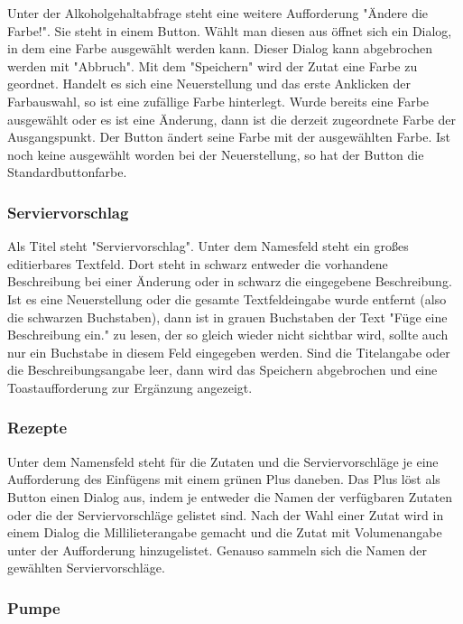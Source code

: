 Unter der Alkoholgehaltabfrage steht eine weitere Aufforderung "Ändere die Farbe!". Sie steht in einem Button. Wählt man diesen aus öffnet sich ein Dialog, in dem eine Farbe ausgewählt werden kann. Dieser Dialog kann abgebrochen werden mit "Abbruch". Mit dem "Speichern" wird der Zutat eine Farbe zu geordnet. Handelt es sich eine Neuerstellung und das erste Anklicken der Farbauswahl, so ist eine zufällige Farbe hinterlegt. Wurde bereits eine Farbe ausgewählt oder es ist eine Änderung, dann ist die derzeit zugeordnete Farbe der Ausgangspunkt. Der Button ändert seine Farbe mit der ausgewählten Farbe. Ist noch keine ausgewählt worden bei der Neuerstellung, so hat der Button die Standardbuttonfarbe.

\subsubsection{ Serviervorschlag}

Als Titel steht "Serviervorschlag". Unter dem Namesfeld steht ein großes editierbares Textfeld. Dort steht in schwarz entweder die vorhandene Beschreibung bei einer Änderung oder in schwarz die eingegebene Beschreibung. Ist es eine Neuerstellung oder die gesamte Textfeldeingabe wurde entfernt (also die schwarzen Buchstaben), dann ist in grauen Buchstaben der Text "Füge eine Beschreibung ein." zu lesen, der so gleich wieder nicht sichtbar wird, sollte auch nur ein Buchstabe in diesem Feld eingegeben werden. Sind die Titelangabe oder die Beschreibungsangabe leer, dann wird das Speichern abgebrochen und eine Toastaufforderung zur Ergänzung angezeigt.

\subsubsection{ Rezepte}

Unter dem Namensfeld steht für die Zutaten und die Serviervorschläge je eine Aufforderung des Einfügens mit einem grünen Plus daneben. Das Plus löst als Button einen Dialog aus, indem je entweder die Namen der verfügbaren Zutaten oder die der Serviervorschläge gelistet sind. Nach der Wahl einer Zutat wird in einem Dialog die Millilieterangabe gemacht und die Zutat mit Volumenangabe unter der Aufforderung hinzugelistet. Genauso sammeln sich die Namen der gewählten Serviervorschläge.

\subsubsection{ Pumpe}

